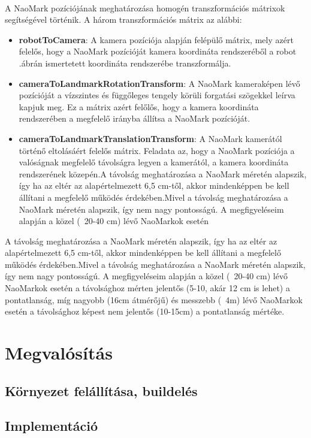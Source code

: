 \documentclass{article}
\numberwithin{figure}{section}
\newcommand{\figref}[1]{\aref{fig:#1}.ábr}
\newenvironment{compactlist}
{ \begin{itemize}
    \setlength{\itemsep}{0pt}
    \setlength{\parskip}{0pt}
    \setlength{\parsep}{0pt}
	\setlength{\topsep}{0pt}
}
{ \end{itemize}}
\begin{document}
\begin{sloppypar}
		\paragraph{}
		A NaoMark pozíciójának meghatározása homogén transzformációs mátrixok segítségével történik. A három transzformációs mátrix az alábbi:
		\begin{compactlist}
			\item \textbf{robotToCamera}: A kamera pozíciója alapján felépülő mátrix, mely azért felelős, hogy a NaoMark pozícióját kamera koordináta rendszeréből a robot \figref{coords}án ismertetett koordináta rendszerébe transzformálja.
			\item \textbf{cameraToLandmarkRotationTransform}: A NaoMark kameraképen lévő pozícióját a vízszintes és függőleges tengely körüli forgatási szögekkel leírva kapjuk meg. Ez a mátrix azért felőlős, hogy a kamera koordináta rendszerében a megfelelő irányba állítsa a NaoMark pozícióját.
			\item \textbf{cameraToLandmarkTranslationTransform}: A NaoMark kamerától történő eltolásáért felelős mátrix. Feladata az, hogy a NaoMark pozíciója a valóságnak megfelelő távolságra legyen a kamerától, a kamera koordináta rendszerének közepén.A távolság meghatározása a NaoMark méretén alapszik, így ha az eltér az alapértelmezett 6,5 cm-től, akkor mindenképpen be kell állítani a megfelelő működés érdekében.Mivel a távolság meghatározása a NaoMark méretén alapszik, így nem nagy pontosságú. A megfigyeléseim alapján a közel (~20-40 cm) lévő NaoMarkok esetén 
		\end{compactlist}
		A távolság meghatározása a NaoMark méretén alapszik, így ha az eltér az alapértelmezett 6,5 cm-től, akkor mindenképpen be kell állítani a megfelelő működés érdekében.Mivel a távolság meghatározása a NaoMark méretén alapszik, így nem nagy pontosságú. A megfigyeléseim alapján a közel (~20-40 cm) lévő NaoMarkok esetén a távolsághoz mérten jelentős (5-10, akár 12 cm is lehet) a pontatlanság, míg nagyobb (16cm átmérőjű) és messzebb (~4m) lévő NaoMarkok esetén a távolsághoz képest nem jelentős (10-15cm) a pontatlanság mértéke.
		\section{Megvalósítás}
		\subsection{Környezet felállítása, buildelés}
		\paragraph{}
		
		\subsection{Implementáció}
		\paragraph{}		
		
	\end{sloppypar}
\end{document}
